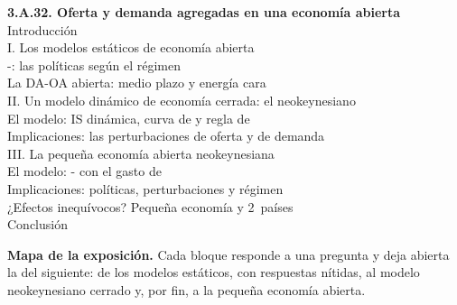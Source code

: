 \documentclass[11pt]{article}
\begin{document}
\begin{esquema}[unbreakable]
\textbf{3.A.32. Oferta y demanda agregadas en una economía abierta}\\[2pt]
Introducción\\
I. Los modelos estáticos de economía abierta\\
\hspace*{1.5em}-: las políticas según el régimen\\
\hspace*{1.5em}La DA-OA abierta: medio plazo y energía cara\\
II. Un modelo dinámico de economía cerrada: el neokeynesiano\\
\hspace*{1.5em}El modelo: IS dinámica, curva de  y regla de \\
\hspace*{1.5em}Implicaciones: las perturbaciones de oferta y de demanda\\
III. La pequeña economía abierta neokeynesiana\\
\hspace*{1.5em}El modelo: - con el gasto de \\
\hspace*{1.5em}Implicaciones: políticas, perturbaciones y régimen\\
\hspace*{1.5em}¿Efectos inequívocos? Pequeña economía y 2~países\\
Conclusión
\end{esquema}


\begin{anotaciones}
\textbf{Mapa de la exposición.} Cada bloque responde a una pregunta y deja abierta la del siguiente: de los modelos estáticos, con respuestas nítidas, al modelo neokeynesiano cerrado y, por fin, a la pequeña economía abierta.
\begin{infografiacaja}
\caption{La estructura del tema: de los modelos estáticos al modelo neokeynesiano de pequeña economía abierta}\label{figu:estructura-tema}
\end{infografiacaja}
\end{anotaciones}
\end{document}
